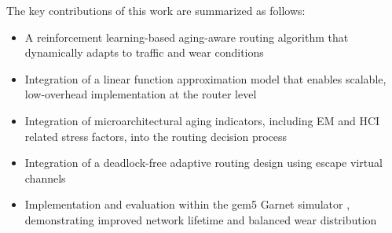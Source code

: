 The key contributions of this work are summarized as follows:
\begin{itemize}
    \item A reinforcement learning-based aging-aware routing algorithm that dynamically adapts to traffic and wear conditions
    \item Integration of a linear function approximation model \cite{LARE2023} that enables scalable, low-overhead implementation at the router level
    \item Integration of microarchitectural aging indicators, including EM \cite{Black1969} and HCI \cite{JEDEC122G} related stress factors, into the routing decision process
    \item Integration of a deadlock-free adaptive routing design \cite{Duato1993} using escape virtual channels
    \item Implementation and evaluation within the gem5 Garnet simulator \cite{gem5} \cite{lowepower2020gem5simulatorversion200}, demonstrating improved network lifetime and balanced wear distribution
\end{itemize}